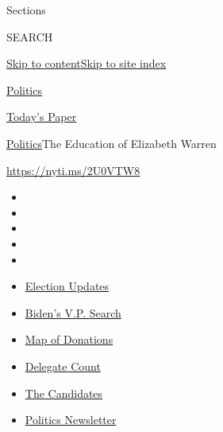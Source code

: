 Sections

SEARCH

\protect\hyperlink{site-content}{Skip to
content}\protect\hyperlink{site-index}{Skip to site index}

\href{https://www.nytimes.com/section/politics}{Politics}

\href{https://myaccount.nytimes.com/auth/login?response_type=cookie\&client_id=vi}{}

\href{https://www.nytimes.com/section/todayspaper}{Today's Paper}

\href{/section/politics}{Politics}\textbar{}The Education of Elizabeth
Warren

\url{https://nyti.ms/2U0VTW8}

\begin{itemize}
\item
\item
\item
\item
\item
\end{itemize}

\begin{itemize}
\item
  \href{https://www.nytimes.com/2020/07/31/us/elections/biden-vs-trump.html?action=click\&pgtype=Article\&state=default\&region=TOP_BANNER\&context=storylines_menu}{Election
  Updates}
\item
  \href{https://www.nytimes.com/article/biden-vice-president-2020.html?action=click\&pgtype=Article\&state=default\&region=TOP_BANNER\&context=storylines_menu}{Biden's
  V.P. Search}
\item
  \href{https://www.nytimes.com/interactive/2020/07/24/us/politics/trump-biden-campaign-donors.html?action=click\&pgtype=Article\&state=default\&region=TOP_BANNER\&context=storylines_menu}{Map
  of Donations}
\item
  \href{https://www.nytimes.com/interactive/2020/us/elections/delegate-count-primary-results.html?action=click\&pgtype=Article\&state=default\&region=TOP_BANNER\&context=storylines_menu}{Delegate
  Count}
\item
  \href{https://www.nytimes.com/interactive/2019/us/politics/2020-presidential-candidates.html?action=click\&pgtype=Article\&state=default\&region=TOP_BANNER\&context=storylines_menu}{The
  Candidates}
\item
  \href{https://www.nytimes.com/newsletters/politics?action=click\&pgtype=Article\&state=default\&region=TOP_BANNER\&context=storylines_menu}{Politics
  Newsletter}
\end{itemize}

